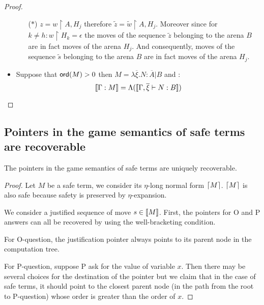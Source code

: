 \begin{proof}
\begin{itemize}
\begin{itemize}
        ($\ast$) $z = w \upharpoonright A, H_j$ therefore $\tilde{z} = \tilde{w} \upharpoonright A, H_j$. Moreover
        since for $k\neq h : w \upharpoonright H_k = \epsilon$ the moves of the sequence
        $\tilde{z}$ belonging to the arena $B$ are in fact moves of the arena $H_j$. And consequently,
        moves of the sequence $\tilde{s}$ belonging to the arena $B$ are in fact moves of the arena $H_j$.

        \end{itemize}

    \item Suppose that ${\sf ord}(M) > 0$ then $M = \lambda \overline{\xi} . N : \overline{A}|B$ and :
    $$ {[\![ \Gamma : M ]\!]} = \Lambda( {[\![ \Gamma,\overline{\xi} \vdash N: B ]\!]} )$$
\end{itemize}

\end{proof}


\subsection{Pointers in the game semantics of safe terms are recoverable}

\begin{prop}
The pointers in the game semantics of safe terms are
uniquely recoverable.
\end{prop}

\begin{proof}
Let $M$ be a safe term, we consider its $\eta$-long normal form $\lceil M\rceil$.
$\lceil M\rceil$ is also safe because safety is preserved by $\eta$-expansion.

We consider a justified sequence of move $s \in {[\![M ]\!]}$.
First, the pointers for O and P answers can all be recovered by using the well-bracketing condition.

For O-question, the justification pointer always points to its
parent node in the computation tree.

For P-question, suppose P ask for the value of variable $x$. Then
there may be several choices for the destination of the pointer but
we claim that in the case of safe terms, it should point to the
closest parent node (in the path from the root to P-question) whose
order is greater than the order of $x$.
\end{proof}
